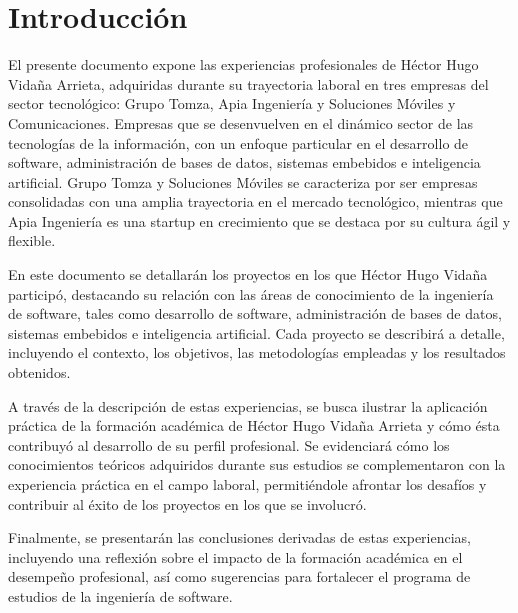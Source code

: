 \documentclass[final, fmstyle, 12pt]{article}
\begin{document}
\section{Introducción}
\setlength{\parskip}{1em} 
El presente documento expone las experiencias profesionales de Héctor Hugo Vidaña Arrieta, 
adquiridas durante su trayectoria laboral en tres empresas del sector tecnológico: 
Grupo Tomza, Apia Ingeniería y Soluciones Móviles y Comunicaciones. 
Empresas que se desenvuelven en el dinámico sector de las tecnologías de la información, 
con un enfoque particular en el desarrollo de software, administración de bases de datos,
sistemas embebidos e inteligencia artificial. Grupo Tomza y Soluciones Móviles se caracteriza por ser empresas consolidadas con una amplia trayectoria en el mercado tecnológico, mientras que Apia Ingeniería es una startup en crecimiento que se destaca por su cultura ágil y flexible.

En este documento se detallarán los proyectos en los que Héctor Hugo Vidaña participó, destacando su relación con las áreas de conocimiento de la ingeniería de software, tales como  desarrollo de software, administración de bases de datos,
sistemas embebidos e inteligencia artificial.  Cada proyecto se describirá a detalle, incluyendo el contexto, los objetivos, las metodologías empleadas y los resultados obtenidos.

A través de la descripción de estas experiencias, se busca ilustrar la aplicación práctica de la formación académica de Héctor Hugo Vidaña Arrieta y cómo ésta contribuyó al desarrollo de su perfil profesional. Se  evidenciará cómo los conocimientos teóricos adquiridos durante sus estudios se complementaron con la experiencia práctica en el campo laboral,  permitiéndole afrontar los desafíos y  contribuir al éxito de los proyectos en los que se involucró.

Finalmente, se presentarán las conclusiones derivadas de estas experiencias, incluyendo una reflexión sobre el impacto de la formación académica en el desempeño profesional,  así como  sugerencias para fortalecer el programa de estudios de la ingeniería de software.
\newpage
\tableofcontents 
\end{document}
